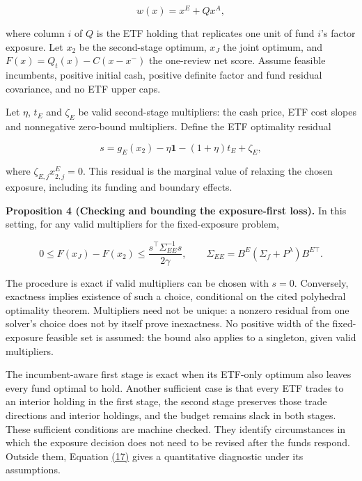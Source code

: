 \documentclass[11pt]{article}
\begin{document}
\begin{equation*}
w(x)=x^E+Qx^A,
\tag{15}\label{eq:15}
\end{equation*}

where column \(i\) of \(Q\) is the ETF holding that replicates one unit of fund \(i\)'s factor exposure. Let \(x_2\) be the second-stage optimum, \(x_J\) the joint optimum, and \(F(x)=Q_t(x)-C(x-x^-)\) the one-review net score. Assume feasible incumbents, positive initial cash, positive definite factor and fund residual covariance, and no ETF upper caps.

Let \(\eta\), \(t_E\) and \(\zeta_E\) be valid second-stage multipliers: the cash price, ETF cost slopes and nonnegative zero-bound multipliers. Define the ETF optimality residual

\begin{equation*}
s=g_E(x_2)-\eta\mathbf1-(1+\eta)t_E+\zeta_E,
\tag{16}\label{eq:16}
\end{equation*}

where \(\zeta_{E,j}x^E_{2,j}=0\). This residual is the marginal value of relaxing the chosen exposure, including its funding and boundary effects.

\label{res:Proposition-4}
\textbf{Proposition 4 (Checking and bounding the exposure-first loss).} In this setting, for any valid multipliers for the fixed-exposure problem,

\begin{equation*}
0\leq F(x_J)-F(x_2)\leq
\frac{s^\top\Sigma_{EE}^{-1}s}{2\gamma},
\qquad \Sigma_{EE}=B^E(\Sigma_f+P^\lambda)B^{E\top}.
\tag{17}\label{eq:17}
\end{equation*}

The procedure is exact if valid multipliers can be chosen with \(s=0\). Conversely, exactness implies existence of such a choice, conditional on the cited polyhedral optimality theorem. Multipliers need not be unique: a nonzero residual from one solver's choice does not by itself prove inexactness. No positive width of the fixed-exposure feasible set is assumed: the bound also applies to a singleton, given valid multipliers.

The incumbent-aware first stage is exact when its ETF-only optimum also leaves every fund optimal to hold. Another sufficient case is that every ETF trades to an interior holding in the first stage, the second stage preserves those trade directions and interior holdings, and the budget remains slack in both stages. These sufficient conditions are machine checked. They identify circumstances in which the exposure decision does not need to be revised after the funds respond. Outside them, Equation \hyperref[eq:17]{(17)} gives a quantitative diagnostic under its assumptions.
\end{document}
